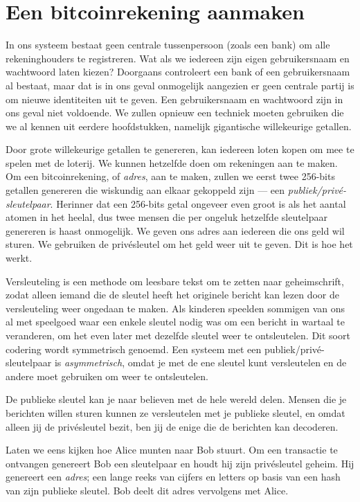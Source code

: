 \documentclass[smalldemyvopaper,11pt,twoside,onecolumn,openright,extrafontsizes]{memoir}
\begin{document}
\section{Een bitcoinrekening aanmaken}

In ons systeem bestaat geen centrale tussenpersoon (zoals een bank) om alle rekeninghouders te registreren. Wat als we iedereen zijn eigen gebruikersnaam en wachtwoord laten kiezen? Doorgaans controleert een bank of een gebruikersnaam al bestaat, maar dat is in ons geval onmogelijk aangezien er geen centrale partij is om nieuwe identiteiten uit te geven. Een gebruikersnaam en wachtwoord zijn in ons geval niet voldoende. We zullen opnieuw een techniek moeten gebruiken die we al kennen uit eerdere hoofdstukken, namelijk gigantische willekeurige getallen. 

Door grote willekeurige getallen te genereren, kan iedereen loten kopen om mee te spelen met de loterij. We kunnen hetzelfde doen om rekeningen aan te maken. Om een bitcoinrekening, of \textit{adres}, aan te maken, zullen we eerst twee 256-bits getallen genereren die wiskundig aan elkaar gekoppeld zijn --- een \textit{publiek/privé-sleutelpaar}. Herinner dat een 256-bits getal ongeveer even groot is als het aantal atomen in het heelal, dus twee mensen die per ongeluk hetzelfde sleutelpaar genereren is haast onmogelijk. We geven ons adres aan iedereen die ons geld wil sturen. We gebruiken de privésleutel om het geld weer uit te geven. Dit is hoe het werkt.

Versleuteling is een methode om leesbare tekst om te zetten naar geheimschrift, zodat alleen iemand die de sleutel heeft het originele bericht kan lezen door de versleuteling weer ongedaan te maken. Als kinderen speelden sommigen van ons al met speelgoed waar een enkele sleutel nodig was om een bericht in wartaal te veranderen, om het even later met dezelfde sleutel weer te ontsleutelen. Dit soort codering wordt symmetrisch genoemd. Een systeem met een publiek/privé-sleutelpaar is \textit{asymmetrisch}, omdat je met de ene sleutel kunt versleutelen en de andere moet gebruiken om weer te ontsleutelen.

De publieke sleutel kan je naar believen met de hele wereld delen. Mensen die je berichten willen sturen kunnen ze versleutelen met je publieke sleutel, en omdat alleen jij de privésleutel bezit, ben jij de enige die de berichten kan decoderen.

Laten we eens kijken hoe Alice munten naar Bob stuurt. Om een transactie te ontvangen genereert Bob een sleutelpaar en houdt hij zijn privésleutel geheim. Hij genereert een \textit{adres}; een lange reeks van cijfers en letters op basis van een hash van zijn publieke sleutel. Bob deelt dit adres vervolgens met Alice.
\end{document}
